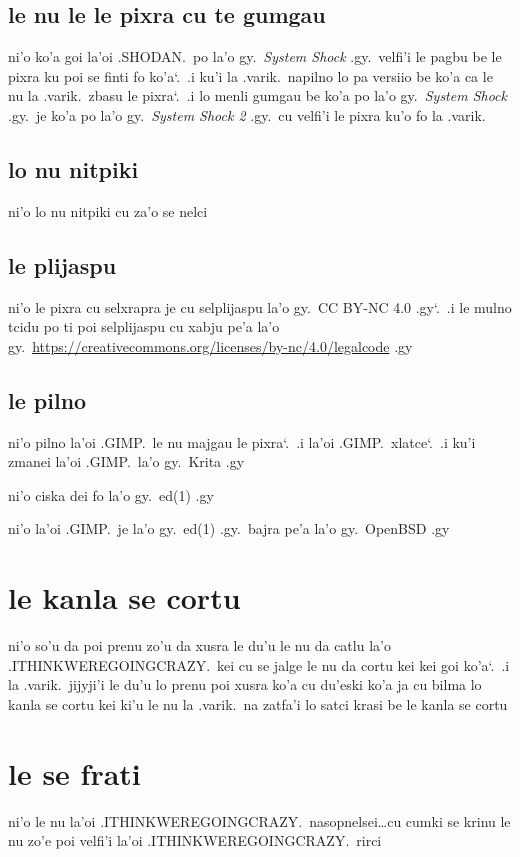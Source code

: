 \documentclass{report}
\newcommand\sds{\spacefactor\sfcode`.\ \space}
\begin{document}
\subsection{le nu le le pixra cu te gumgau}
ni'o ko'a goi la'oi .SHODAN.\ po la'o gy.\ \textit{System Shock} .gy.\ velfi'i le pagbu be le pixra ku poi se finti fo ko'a\sds  .i ku'i la .varik.\ napilno lo pa versiio be ko'a ca le nu la .varik.\ zbasu le pixra\sds  .i lo menli gumgau be ko'a po la'o gy.\ \textit{System Shock} .gy.\ je ko'a po la'o gy.\ \textit{System Shock 2} .gy.\ cu velfi'i le pixra ku'o fo la .varik.
\subsection{lo nu nitpiki}
ni'o lo nu nitpiki cu za'o se nelci

\subsection{le plijaspu}
ni'o le pixra cu selxrapra je cu selplijaspu la'o gy.\ CC BY-NC 4.0 .gy\sds  .i le mulno tcidu po ti poi selplijaspu cu xabju pe'a la'o gy.\ \url{https://creativecommons.org/licenses/by-nc/4.0/legalcode} .gy

\subsection{le pilno}
ni'o pilno la'oi .GIMP.\ le nu majgau le pixra\sds  .i  la'oi .GIMP.\ xlatce\sds  .i ku'i zmanei la'oi .GIMP.\ la'o gy.\ Krita .gy

ni'o ciska dei fo la'o gy.\ ed(1) .gy

ni'o la'oi .GIMP.\ je la'o gy.\ ed(1) .gy.\ bajra pe'a la'o gy.\ OpenBSD .gy

\section{le kanla se cortu}
ni'o so'u da poi prenu zo'u da xusra le du'u le nu da catlu la'o .ITHINKWEREGOINGCRAZY.\ kei cu se jalge le nu da cortu kei kei goi ko'a\sds  .i la .varik.\ jijyji'i le du'u lo prenu poi xusra ko'a cu du'eski ko'a ja cu bilma lo kanla se cortu kei ki'u le nu la .varik.\ na zatfa'i lo satci krasi be le kanla se cortu

\section{le se frati}
ni'o le nu la'oi .ITHINKWEREGOINGCRAZY.\ nasopnelsei\ldots cu cumki se krinu le nu zo'e poi velfi'i la'oi .ITHINKWEREGOINGCRAZY.\ rirci
\end{document}
